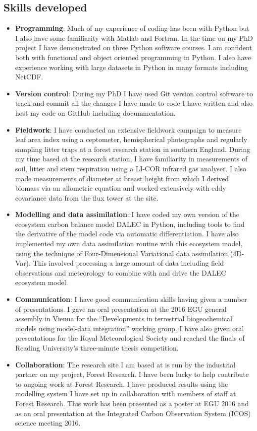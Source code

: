 \documentclass[11pt]{article}
\begin{document}
\subsection*{Skills developed}
\begin{itemize}
\item \textbf{Programming}: Much of my experience of coding has been with Python but I also have some familiarity with Matlab and Fortran. In the time on my PhD project I have demonstrated on three Python software courses. I am confident both with functional and object oriented programming in Python. I also have experience working with large datasets in Python in many formats including NetCDF. 
\item \textbf{Version control}: During my PhD I have used Git version control software to track and commit all the changes I have made to code I have written and also host my code on GitHub including docummentation. 
\item \textbf{Fieldwork}: I have conducted an extensive fieldwork campaign to measure leaf area index using a ceptometer, hemispherical photographs and regularly sampling litter traps at a forest research station in southern England. During my time based at the research station, I have familiarity in measurements of soil, litter and stem respiration using a LI-COR infrared gas analyser. I also made measurements of diameter at breast height from which I derived biomass via an allometric equation and worked extensively with eddy covariance data from the flux tower at the site. 
\item \textbf{Modelling and data assimilation}: I have coded my own version of the ecosystem carbon balance model DALEC in Python, including tools to find the derivative of the model code via automatic differentiation. I have also implemented my own data assimilation routine with this ecosystem model, using the technique of Four-Dimensional Variational data assimilation (4D-Var). This involved processing a large amount of data including field observations and meteorology to combine with and drive the DALEC ecosystem model.
\item \textbf{Communication}: I have good communication skills having given a number of presentations. I gave an oral presentation at the 2016 EGU general assembly in Vienna for the ``Developments in terrestrial biogeochemical models using model-data integration'' working group. I have also given oral presentations for the Royal Meteorological Society and reached the finals of Reading University's three-minute thesis competition.
\item \textbf{Collaboration}: The research site I am based at is run by the industrial partner on my project, Forest Research. I have been lucky to help contribute to ongoing work at Forest Research. I have produced results using the modelling system I have set up in collaboration with members of staff at Forest Research. This work has been presented as a poster at EGU 2016 and as an oral presentation at the Integrated Carbon Observation System (ICOS) science meeting 2016. 
\end{itemize}
\end{document}
